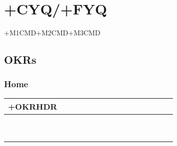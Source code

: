 \chapter*{\textbf{+CYQ/+FYQ}}

\begin{center}
+M1CMD+M2CMD+M3CMD
\end{center}

\pagebreak

\section*{OKRs}
\subsection*{Home}
\begin{tabularx}{\textwidth}{|p{1.5in}|p{1.5in}||X|X|X|X|X|X|X|X|X|X|X|X|X|}
    \hline
    +OKRHDR \\ \hline\hline
    &            &    &    &    &    &    &    &    &    &    &    &    &    &    \\ \cline{2-15}
    &            &    &    &    &    &    &    &    &    &    &    &    &    &    \\ \cline{2-15}
    &            &    &    &    &    &    &    &    &    &    &    &    &    &    \\ \hline
    &            &    &    &    &    &    &    &    &    &    &    &    &    &    \\ \cline{2-15}
    &            &    &    &    &    &    &    &    &    &    &    &    &    &    \\ \cline{2-15}
    &            &    &    &    &    &    &    &    &    &    &    &    &    &    \\ \hline
    &            &    &    &    &    &    &    &    &    &    &    &    &    &    \\ \cline{2-15}
    &            &    &    &    &    &    &    &    &    &    &    &    &    &    \\ \cline{2-15}
    &            &    &    &    &    &    &    &    &    &    &    &    &    &    \\ \hline
\end{tabularx}

